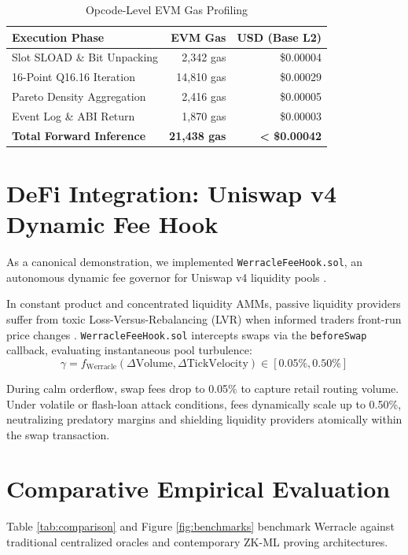 \documentclass[10pt,twocolumn]{article}
\begin{document}
\begin{table}[h]
\centering
\caption{Opcode-Level EVM Gas Profiling}
\label{tab:gas}
\small
\setlength{\tabcolsep}{3.5pt}
\begin{tabular}{lrr}
\toprule
\textbf{Execution Phase} & \textbf{EVM Gas} & \textbf{USD (Base L2)} \\
\midrule
Slot SLOAD \& Bit Unpacking & 2,342 gas & \$0.00004 \\
16-Point Q16.16 Iteration & 14,810 gas & \$0.00029 \\
Pareto Density Aggregation & 2,416 gas & \$0.00005 \\
Event Log \& ABI Return & 1,870 gas & \$0.00003 \\
\midrule
\textbf{Total Forward Inference} & \textbf{21,438 gas} & \textbf{< \$0.00042} \\
\bottomrule
\end{tabular}
\end{table}

\section{DeFi Integration: Uniswap v4 Dynamic Fee Hook}
As a canonical demonstration, we implemented \texttt{WerracleFeeHook.sol}, an autonomous dynamic fee governor for Uniswap v4 liquidity pools \cite{uniswap2024v4}.

In constant product and concentrated liquidity AMMs, passive liquidity providers suffer from toxic Loss-Versus-Rebalancing (LVR) when informed traders front-run price changes \cite{milionis2023automated, daian2020flash}. \texttt{WerracleFeeHook.sol} intercepts swaps via the \texttt{beforeSwap} callback, evaluating instantaneous pool turbulence:
\begin{equation}
\gamma = f_{\text{Werracle}}(\Delta \text{Volume}, \Delta \text{TickVelocity}) \in [0.05\%, 0.50\%]
\end{equation}

During calm orderflow, swap fees drop to 0.05\% to capture retail routing volume. Under volatile or flash-loan attack conditions, fees dynamically scale up to 0.50\%, neutralizing predatory margins and shielding liquidity providers atomically within the swap transaction.

\section{Comparative Empirical Evaluation}
Table \ref{tab:comparison} and Figure \ref{fig:benchmarks} benchmark Werracle against traditional centralized oracles and contemporary ZK-ML proving architectures.
\end{document}
